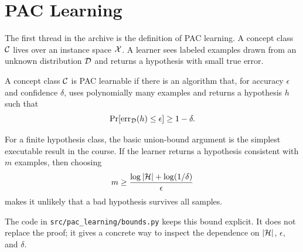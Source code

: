 \section{PAC Learning}

The first thread in the archive is the definition of PAC learning. A concept
class $\mathcal{C}$ lives over an instance space $\mathcal{X}$. A learner sees labeled examples
drawn from an unknown distribution $\mathcal{D}$ and returns a hypothesis with small
true error.

\begin{definition}
A concept class $\mathcal{C}$ is PAC learnable if there is an algorithm that, for
accuracy $\epsilon$ and confidence $\delta$, uses polynomially many examples
and returns a hypothesis $h$ such that
\[
  \Pr[\operatorname{err}_{\mathcal{D}}(h) \leq \epsilon] \geq 1-\delta.
\]
\end{definition}

For a finite hypothesis class, the basic union-bound argument is the simplest
executable result in the course. If the learner returns a hypothesis consistent
with $m$ examples, then choosing
\[
  m \geq \frac{\log |\mathcal{H}| + \log(1/\delta)}{\epsilon}
\]
makes it unlikely that a bad hypothesis survives all samples.

The code in \texttt{src/pac\_learning/bounds.py} keeps this bound explicit. It
does not replace the proof; it gives a concrete way to inspect the dependence
on $|\mathcal{H}|$, $\epsilon$, and $\delta$.

